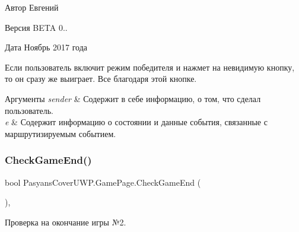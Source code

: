 \begin{DoxyAuthor}{Автор}
Евгений 
\end{DoxyAuthor}
\begin{DoxyVersion}{Версия}
B\+E\+TA 0.. 
\end{DoxyVersion}
\begin{DoxyDate}{Дата}
Ноябрь 2017 года
\end{DoxyDate}
Если пользователь включит режим победителя и нажмет на невидимую кнопку, то он сразу же выиграет. Все благодаря этой кнопке. 
\begin{DoxyParams}{Аргументы}
{\em sender} & Содержит в себе информацию, о том, что сделал пользователь. \\
\hline
{\em e} & Содержит информацию о состоянии и данные события, связанные с маршрутизируемым событием. \\
\hline
\end{DoxyParams}
\mbox{\label{class_pasyans_cover_u_w_p_1_1_game_page_add7dd4a8c8e74aa19f6042801eb45da3}} 
\subsubsection{\texorpdfstring{Check\+Game\+End()}{CheckGameEnd()}}
{\footnotesize\ttfamily bool Pasyans\+Cover\+U\+W\+P.\+Game\+Page.\+Check\+Game\+End (\begin{DoxyParamCaption}{ }\end{DoxyParamCaption})\hspace{0.3cm}{\ttfamily [inline]}, {\ttfamily [private]}}



Проверка на окончание игры №2. 

